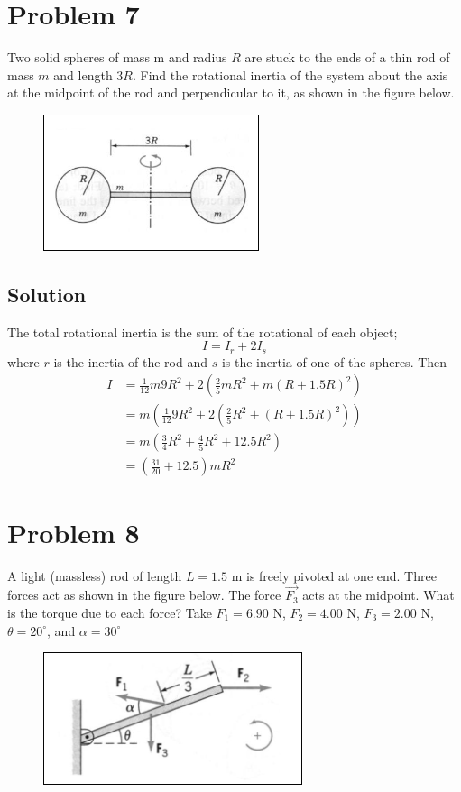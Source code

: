 \documentclass{article}
\begin{document}
\section*{Problem 7}
Two solid spheres of mass m and radius $R$ are stuck to the ends of a thin rod of mass $m$ and
length $3R$. Find the rotational inertia of the system about the axis at the midpoint of the rod and
perpendicular to it, as shown in the figure below.

\begin{figure}[ht]
    \centering
    \includegraphics[scale=0.6]{drawing-5.png}
\end{figure}

\subsection*{Solution}
The total rotational inertia is the sum of the rotational of each object;
\[
	I = I_r + 2I_s
\]
where $r$ is the inertia of the rod and $s$ is the inertia of one of the spheres. Then
\begin{align*}
	I &= \frac{1}{12}m9R^2 + 2 \left( \frac{2}{5}mR^2 + m(R + 1.5R)^2 \right) \\
	  &= m \left(\frac{1}{12}9R^2 + 2 \left( \frac{2}{5}R^2 + (R + 1.5R)^2 \right)\right) \\
	  &= m \left( \frac{3}{4}R^2 + \frac{4}{5}R^2 + 12.5R^2\right) \\
	  &= \boxed{\left(\frac{31}{20}+12.5\right)mR^2}
\end{align*}

\section*{Problem 8}
A light (massless) rod of length $L = 1.5$ m is freely pivoted at one end. Three forces act as
shown in the figure below. The force $\vec{F_3}$ acts at the midpoint. What is the torque due to each force?
Take $F_1 = 6.90$ N, $F_2 = 4.00$ N, $F_3 = 2.00$ N, $\theta = 20^\circ$, and $\alpha = 30^\circ$

\begin{figure}[ht]
    \centering
    \includegraphics[scale=0.6]{drawing-6.png}
\end{figure}
\end{document}
